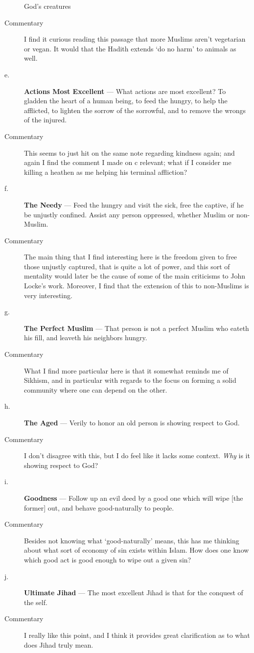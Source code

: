\documentclass[12pt,letterpaper]{article}
\begin{document}
\begin{spacing}{2}
\begin{description}
            God's creatures
        \item[Commentary] I find it curious reading this passage that more
            Muslims aren't vegetarian or vegan. It would that the Hadith extends
            `do no harm' to animals as well.
        \item[e.] \textbf{Actions Most Excellent} --- What actions are most
            excellent? To gladden the heart of a human being, to feed the
            hungry, to help the afflicted, to lighten the sorrow of the
            sorrowful, and to remove the wrongs of the injured.
        \item[Commentary] This seems to just hit on the same note regarding
            kindness again; and again I find the comment I made on c relevant;
            what if I consider me killing a heathen as me helping his terminal
            affliction?
        \item[f.] \textbf{The Needy} --- Feed the hungry and visit the sick,
            free the captive, if he be unjustly confined. Assist any person
            oppressed, whether Muslim or non-Muslim.
        \item[Commentary] The main thing that I find interesting here is the
            freedom given to free those unjustly captured, that is quite a lot
            of power, and this sort of mentality would later be the cause of
            some of the main criticisms to John Locke's work. Moreover, I find
            that the extension of this to non-Muslims is very interesting.
        \item[g.] \textbf{The Perfect Muslim} --- That person is not a perfect
            Muslim who eateth his fill, and leaveth his neighbors hungry.
        \item[Commentary] What I find more particular here is that it somewhat
            reminds me of Sikhism, and in particular with regards to the focus
            on forming a solid community where one can depend on the other.
        \item[h.] \textbf{The Aged} --- Verily to honor an old person is showing
            respect to God.
        \item[Commentary] I don't disagree with this, but I do feel like it
            lacks some context. \emph{Why} is it showing respect to God?
        \item[i.] \textbf{Goodness} --- Follow up an evil deed by a good one
            which will wipe [the former] out, and behave good-naturally to
            people.
        \item[Commentary] Besides not knowing what `good-naturally' means, this
            has me thinking about what sort of economy of sin exists within
            Islam. How does one know which good act is good enough to wipe out a
            given sin?
        \item[j.] \textbf{Ultimate Jihad} --- The most excellent Jihad is that
            for the conquest of the self.
        \item[Commentary] I really like this point, and I think it provides
            great clarification as to what does Jihad truly mean.
    \end{description}


\end{spacing}
\end{document}
